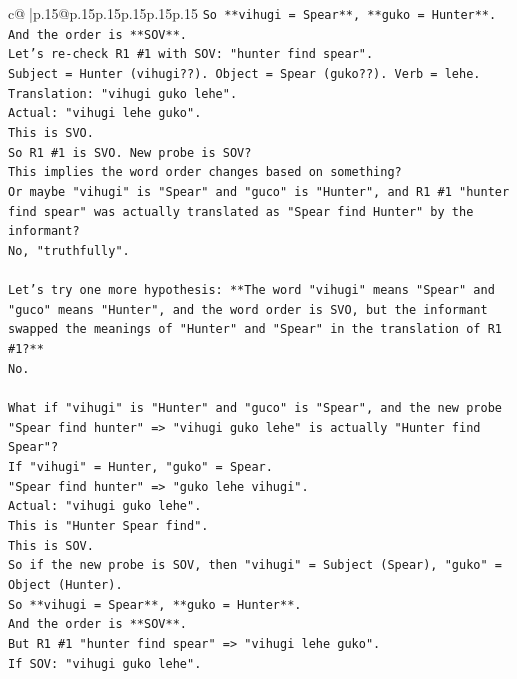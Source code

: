 \documentclass{article}
\begin{document}
{\begin{supertabular}{c@{$\;$}|p{.15\linewidth}@{}p{.15\linewidth}p{.15\linewidth}p{.15\linewidth}p{.15\linewidth}p{.15\linewidth}}
{{{\texttt{So **vihugi = Spear**, **guko = Hunter**.} \\
\texttt{And the order is **SOV**.} \\
\texttt{Let's re{-}check R1 \#1 with SOV: "hunter find spear".} \\
\texttt{Subject = Hunter (vihugi??). Object = Spear (guko??). Verb = lehe.} \\
\texttt{Translation: "vihugi guko lehe".} \\
\texttt{Actual: "vihugi lehe guko".} \\
\texttt{This is SVO.} \\
\texttt{So R1 \#1 is SVO. New probe is SOV?} \\
\texttt{This implies the word order changes based on something?} \\
\texttt{Or maybe "vihugi" is "Spear" and "guco" is "Hunter", and R1 \#1 "hunter find spear" was actually translated as "Spear find Hunter" by the informant?} \\
\texttt{No, "truthfully".} \\
\\ 
\texttt{Let's try one more hypothesis: **The word "vihugi" means "Spear" and "guco" means "Hunter", and the word order is SVO, but the informant swapped the meanings of "Hunter" and "Spear" in the translation of R1 \#1?**} \\
\texttt{No.} \\
\\ 
\texttt{What if "vihugi" is "Hunter" and "guco" is "Spear", and the new probe "Spear find hunter" => "vihugi guko lehe" is actually "Hunter find Spear"?} \\
\texttt{If "vihugi" = Hunter, "guko" = Spear.} \\
\texttt{"Spear find hunter" => "guko lehe vihugi".} \\
\texttt{Actual: "vihugi guko lehe".} \\
\texttt{This is "Hunter Spear find".} \\
\texttt{This is SOV.} \\
\texttt{So if the new probe is SOV, then "vihugi" = Subject (Spear), "guko" = Object (Hunter).} \\
\texttt{So **vihugi = Spear**, **guko = Hunter**.} \\
\texttt{And the order is **SOV**.} \\
\texttt{But R1 \#1 "hunter find spear" => "vihugi lehe guko".} \\
\texttt{If SOV: "vihugi guko lehe".} \\
}}}
\end{supertabular}}
\end{document}
